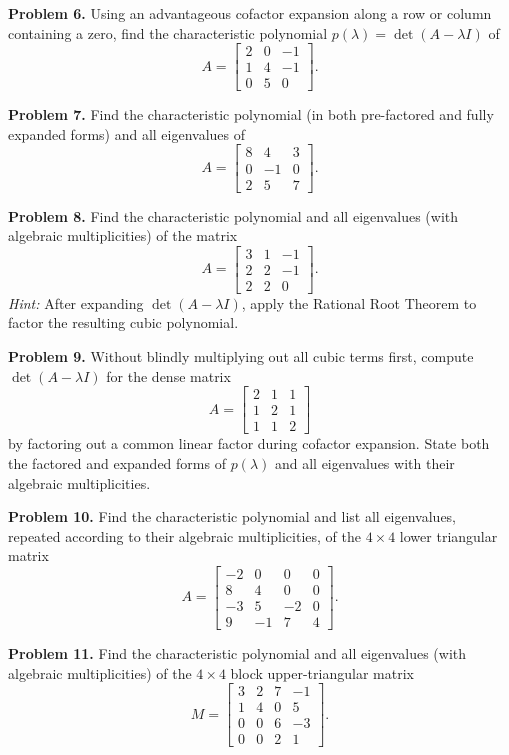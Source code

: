 \documentclass[11pt, letterpaper]{article}
\theoremstyle{definition}
\theoremstyle{remark}
\begin{document}
\noindent\textbf{Problem 6.} Using an advantageous cofactor expansion along a row or column containing a zero, find the characteristic polynomial $p(\lambda) = \det(A - \lambda I)$ of
\[
A = \begin{bmatrix} 2 & 0 & -1 \\ 1 & 4 & -1 \\ 0 & 5 & 0 \end{bmatrix}.
\]

\noindent\textbf{Problem 7.} Find the characteristic polynomial (in both pre-factored and fully expanded forms) and all eigenvalues of
\[
A = \begin{bmatrix} 8 & 4 & 3 \\ 0 & -1 & 0 \\ 2 & 5 & 7 \end{bmatrix}.
\]

\noindent\textbf{Problem 8.} Find the characteristic polynomial and all eigenvalues (with algebraic multiplicities) of the matrix
\[
A = \begin{bmatrix} 3 & 1 & -1 \\ 2 & 2 & -1 \\ 2 & 2 & 0 \end{bmatrix}.
\]
\textit{Hint:} After expanding $\det(A - \lambda I)$, apply the Rational Root Theorem to factor the resulting cubic polynomial.

\noindent\textbf{Problem 9.} Without blindly multiplying out all cubic terms first, compute $\det(A - \lambda I)$ for the dense matrix
\[
A = \begin{bmatrix} 2 & 1 & 1 \\ 1 & 2 & 1 \\ 1 & 1 & 2 \end{bmatrix}
\]
by factoring out a common linear factor during cofactor expansion. State both the factored and expanded forms of $p(\lambda)$ and all eigenvalues with their algebraic multiplicities.

\noindent\textbf{Problem 10.} Find the characteristic polynomial and list all eigenvalues, repeated according to their algebraic multiplicities, of the $4 \times 4$ lower triangular matrix
\[
A = \begin{bmatrix}
-2 & 0 & 0 & 0 \\
8 & 4 & 0 & 0 \\
-3 & 5 & -2 & 0 \\
9 & -1 & 7 & 4
\end{bmatrix}.
\]

\noindent\textbf{Problem 11.} Find the characteristic polynomial and all eigenvalues (with algebraic multiplicities) of the $4 \times 4$ block upper-triangular matrix
\[
M = \begin{bmatrix}
3 & 2 & 7 & -1 \\
1 & 4 & 0 & 5 \\
0 & 0 & 6 & -3 \\
0 & 0 & 2 & 1
\end{bmatrix}.
\]
\end{document}
